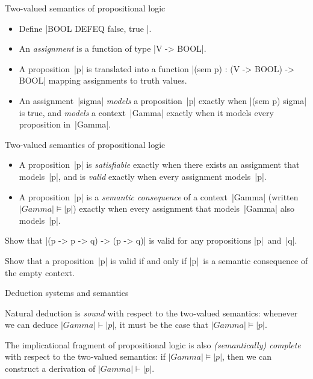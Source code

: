 \documentclass[t,compress,hyperref={hidelinks}]{beamer}
\begin{document}
\begin{frame}{Two-valued semantics of propositional logic}

\begin{itemize}

\item Define |BOOL DEFEQ { false, true }|.

\item An \emph{assignment} is a function of type |V -> BOOL|.

\item A proposition~|p| is translated into a function |(sem p) : (V -> BOOL) -> BOOL| mapping assignments to truth values.

\item An assignment~|sigma| \emph{models} a proposition~|p| exactly when |(sem p) sigma| is true, and \emph{models} a context~|Gamma| exactly when it models every proposition in~|Gamma|.

\end{itemize}

\end{frame}

\begin{frame}{Two-valued semantics of propositional logic}

\begin{itemize}

\item A proposition~|p| is \emph{satisfiable} exactly when there exists an assignment that models~|p|, and is \emph{valid} exactly when every assignment models~|p|.

\item A proposition~|p| is a \emph{semantic consequence} of a context~|Gamma| (written $|Gamma| \models |p|$) exactly when every assignment that models~|Gamma| also models~|p|.

\end{itemize}

 Show that |(p -> p -> q) -> (p -> q)| is valid for any propositions |p|~and~|q|.

 Show that a proposition~|p| is valid if and only if |p|~is a semantic consequence of the empty context.

\end{frame}

\begin{frame}{Deduction systems and semantics}

Natural deduction is \emph{sound} with respect to the two-valued semantics: whenever we can deduce $|Gamma| \vdash |p|$, it must be the case that $|Gamma| \models |p|$.

The implicational fragment of propositional logic is also \emph{(semantically) complete} with respect to the two-valued semantics: if $|Gamma| \models |p|$, then we can construct a derivation of $|Gamma| \vdash |p|$.

\end{frame}
\end{document}
